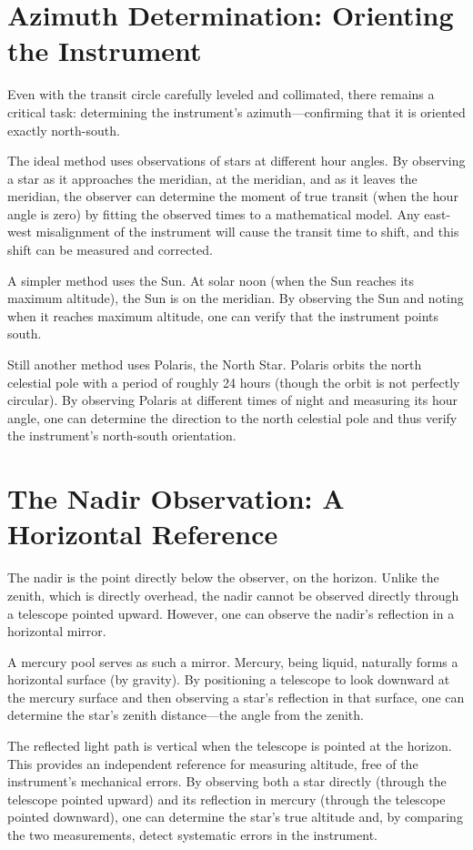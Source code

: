 \section{Azimuth Determination: Orienting the Instrument}

Even with the transit circle carefully leveled and collimated, there remains a critical task: determining the instrument's azimuth—confirming that it is oriented exactly north-south.

The ideal method uses observations of stars at different hour angles. By observing a star as it approaches the meridian, at the meridian, and as it leaves the meridian, the observer can determine the moment of true transit (when the hour angle is zero) by fitting the observed times to a mathematical model. Any east-west misalignment of the instrument will cause the transit time to shift, and this shift can be measured and corrected.

A simpler method uses the Sun. At solar noon (when the Sun reaches its maximum altitude), the Sun is on the meridian. By observing the Sun and noting when it reaches maximum altitude, one can verify that the instrument points south.

Still another method uses Polaris, the North Star. Polaris orbits the north celestial pole with a period of roughly 24 hours (though the orbit is not perfectly circular). By observing Polaris at different times of night and measuring its hour angle, one can determine the direction to the north celestial pole and thus verify the instrument's north-south orientation.

\section{The Nadir Observation: A Horizontal Reference}

The nadir is the point directly below the observer, on the horizon. Unlike the zenith, which is directly overhead, the nadir cannot be observed directly through a telescope pointed upward. However, one can observe the nadir's reflection in a horizontal mirror.

A mercury pool serves as such a mirror. Mercury, being liquid, naturally forms a horizontal surface (by gravity). By positioning a telescope to look downward at the mercury surface and then observing a star's reflection in that surface, one can determine the star's zenith distance—the angle from the zenith.

The reflected light path is vertical when the telescope is pointed at the horizon. This provides an independent reference for measuring altitude, free of the instrument's mechanical errors. By observing both a star directly (through the telescope pointed upward) and its reflection in mercury (through the telescope pointed downward), one can determine the star's true altitude and, by comparing the two measurements, detect systematic errors in the instrument.


